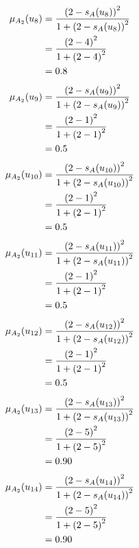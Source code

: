 \documentclass[a4paper,openany]{book}
\begin{document}
				\begin{align}
					\mu_{A_2}(u_8) &= \frac{\left(2-s_A(u_8)\right)^2}{1 + \left(2-s_A(u_8)\right)^2}\\
					&= \frac{\left(2-4\right)^2}{1 + \left(2-4\right)^2} \notag \\
					&= 0.8 \notag
				\end{align}
				\begin{align}
					\mu_{A_2}(u_9) &= \frac{\left(2-s_A(u_9)\right)^2}{1 + \left(2-s_A(u_9)\right)^2}\\
					&= \frac{\left(2-1\right)^2}{1 + \left(2-1\right)^2} \notag \\
					&= 0.5 \notag
				\end{align}
				\begin{align}
					\mu_{A_2}(u_{10}) &= \frac{\left(2-s_A(u_{10})\right)^2}{1 + \left(2-s_A(u_{10})\right)^2}\\
					&= \frac{\left(2-1\right)^2}{1 + \left(2-1\right)^2} \notag \\
					&= 0.5 \notag
				\end{align}
				\begin{align}
					\mu_{A_2}(u_{11}) &= \frac{\left(2-s_A(u_{11})\right)^2}{1 + \left(2-s_A(u_{11})\right)^2}\\
					&= \frac{\left(2-1\right)^2}{1 + \left(2-1\right)^2} \notag \\
					&= 0.5 \notag
				\end{align}
				\begin{align}
					\mu_{A_2}(u_{12}) &= \frac{\left(2-s_A(u_{12})\right)^2}{1 + \left(2-s_A(u_{12})\right)^2}\\
					&= \frac{\left(2-1\right)^2}{1 + \left(2-1\right)^2} \notag \\
					&= 0.5 \notag
				\end{align}
				\begin{align}
					\mu_{A_2}(u_{13}) &= \frac{\left(2-s_A(u_{13})\right)^2}{1 + \left(2-s_A(u_{13})\right)^2}\\
					&= \frac{\left(2-5\right)^2}{1 + \left(2-5\right)^2} \notag \\
					&= 0.90 \notag
				\end{align}
				\begin{align}
					\mu_{A_2}(u_{14}) &= \frac{\left(2-s_A(u_{14})\right)^2}{1 + \left(2-s_A(u_{14})\right)^2}\\
					&= \frac{\left(2-5\right)^2}{1 + \left(2-5\right)^2} \notag \\
					&= 0.90 \notag
				\end{align}
\end{document}

